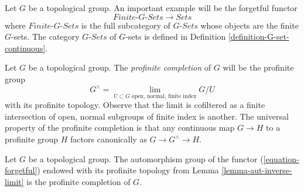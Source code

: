 \begin{example}
\label{example-galois-category-G-sets}
Let $G$ be a topological group. An important example will be the
forgetful functor
\begin{equation}
\label{equation-forgetful}
\textit{Finite-}G\textit{-Sets} \longrightarrow \textit{Sets}
\end{equation}
where $\textit{Finite-}G\textit{-Sets}$ is the full subcategory of
$G\textit{-Sets}$ whose objects are the finite $G$-sets.
The category $G\textit{-Sets}$ of $G$-sets is defined in
Definition \ref{definition-G-set-continuous}.
\end{example}

\noindent
Let $G$ be a topological group. The {\it profinite completion} of $G$
will be the profinite group
$$
G^\wedge =
\lim_{U \subset G\text{ open, normal, finite index}} G/U
$$
with its profinite topology. Observe that the limit is cofiltered
as a finite intersection of open, normal subgroups of finite index
is another. The universal property of the profinite completion is
that any continuous map $G \to H$ to a profinite group $H$ factors
canonically as $G \to G^\wedge \to H$.

\begin{lemma}
\label{lemma-single-out-profinite}
Let $G$ be a topological group. The automorphism group of the functor
(\ref{equation-forgetful}) endowed with its profinite topology from
Lemma \ref{lemma-aut-inverse-limit} is the profinite completion of $G$.
\end{lemma}

